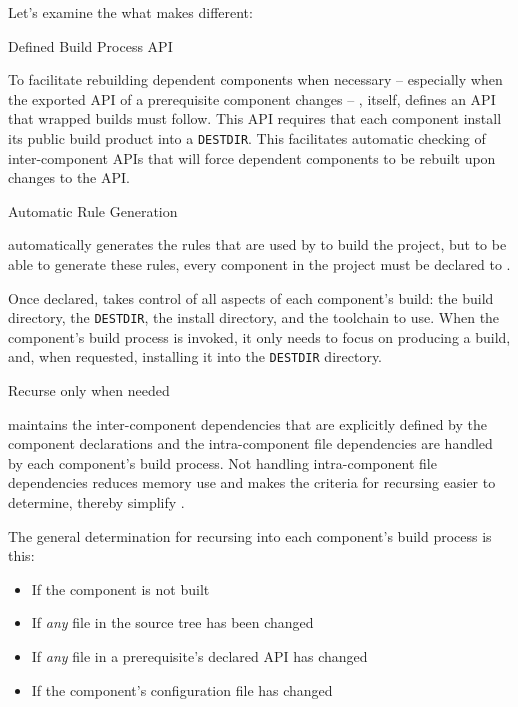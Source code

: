 Let's examine the what makes \lmsbw different:

\begin{description}
\item{Defined Build Process API}

  To facilitate rebuilding dependent components when necessary --
  especially when the exported API of a prerequisite component changes
  -- \lmsbw, itself, defines an API that wrapped builds must follow.
  This API requires that each component install its public build
  product into a \texttt{DESTDIR}.  This facilitates automatic
  checking of inter-component APIs that will force dependent
  components to be rebuilt upon changes to the API.

\item{Automatic Rule Generation}

  \lmsbw automatically generates the rules that are used by \make to
  build the project, but to be able to generate these rules, every
  component in the project must be declared to \lmsbw.

  Once declared, \lmsbw takes control of all aspects of each
  component's build: the build directory, the \texttt{DESTDIR}, the
  install directory, and the toolchain to use.  When the component's
  build process is invoked, it only needs to focus on producing a
  build, and, when requested, installing it into the \texttt{DESTDIR}
  directory.

\item{Recurse only when needed}\label{intro:build-component-criteria}

  \lmsbw maintains the inter-component dependencies that are
  explicitly defined by the component declarations and the
  intra-component file dependencies are handled by each component's
  build process.  Not handling intra-component file dependencies
  reduces memory use and makes the criteria for recursing easier to
  determine, thereby simplify \lmsbw.

  The general determination for recursing into each component's build
  process is this:

  \begin{itemize}
  \item{If the component is not built}
  \item{If \emph{any} file in the source tree has been changed}
  \item{If \emph{any} file in a prerequisite's declared API has changed}
  \item{If the component's configuration file has changed}
  \end{itemize}


\end{description}
